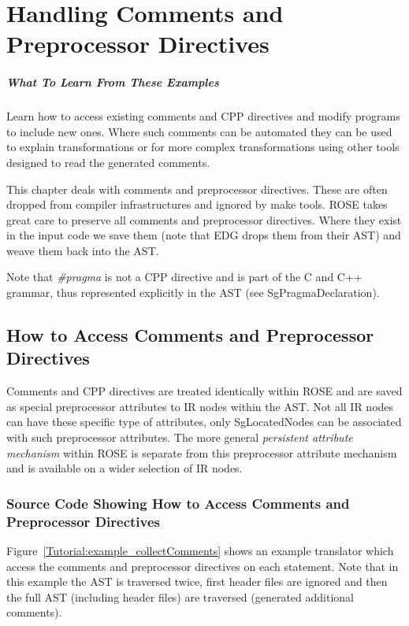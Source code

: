 \chapter{Handling Comments and Preprocessor Directives}

\paragraph{What To Learn From These Examples}
Learn how to access existing comments and CPP directives
and modify programs to include new ones. Where such comments 
can be automated they can be used to explain transformations 
or for more complex transformations using other tools
designed to read the generated comments.

   This chapter deals with comments and preprocessor directives.
These are often dropped from compiler infrastructures and ignored
by make tools.  ROSE takes great care to preserve all comments and
preprocessor directives.  Where they exist in the input code we 
save them (note that EDG drops them from their AST) and weave them
back into the AST.  

Note that {\it \#pragma} is not a CPP directive and is part of the
C and C++ grammar, thus represented explicitly in the AST (see SgPragmaDeclaration).

\section{How to Access Comments and Preprocessor Directives}

   Comments and CPP directives are treated identically within ROSE and are 
saved as special preprocessor attributes to IR nodes within the AST.
Not all IR nodes can have these specific type of attributes, only 
SgLocatedNodes can be associated with such preprocessor attributes.
The more general {\it persistent attribute mechanism} within ROSE is separate from this
preprocessor attribute mechanism and is available on a wider selection of IR nodes.

\subsection{Source Code Showing How to Access Comments and Preprocessor Directives}

    Figure~\ref{Tutorial:example_collectComments}
shows an example translator which access the comments and preprocessor directives on each
statement. Note that in this example the AST is traversed twice, first header files are
ignored and then the full AST (including header files) are traversed (generated additional
comments).

